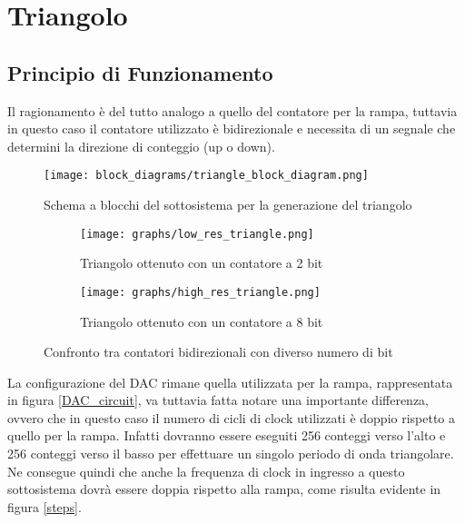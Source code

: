 \section{Triangolo}


\subsection*{Principio di Funzionamento}


Il ragionamento è del tutto analogo a quello del contatore per la rampa, tuttavia in questo
caso il contatore utilizzato è bidirezionale e necessita di un segnale che determini la
direzione di conteggio (up o down).
\medskip

\begin{figure}[ht]
    \centering
    \texttt{[image: block\_diagrams/triangle\_block\_diagram.png]}
    \caption{Schema a blocchi del sottosistema per la generazione del triangolo}
    \label{triangle_block_diagram}
\end{figure}

\begin{figure}[ht]
    \centering

    \begin{subfigure}{.5\textwidth}
        \centering
        \texttt{[image: graphs/low\_res\_triangle.png]}
        \caption{Triangolo ottenuto con un contatore a 2 bit}
        \label{low_res_triangle}
    \end{subfigure}%
    \begin{subfigure}{.5\textwidth}
        \centering
        \texttt{[image: graphs/high\_res\_triangle.png]}
        \caption{Triangolo ottenuto con un contatore a 8 bit}
        \label{high_res_triangle}
    \end{subfigure}

    \caption{Confronto tra contatori bidirezionali con diverso numero di bit}
    \label{triangles}
\end{figure}

La configurazione del DAC rimane quella utilizzata per la rampa, rappresentata in figura
\ref{DAC_circuit}, va tuttavia fatta notare una importante differenza, ovvero che in questo
caso il numero di cicli di clock utilizzati è doppio rispetto a quello per la rampa. Infatti
dovranno essere eseguiti 256 conteggi verso l'alto e 256 conteggi verso il basso per effettuare
un singolo periodo di onda triangolare. Ne consegue quindi che anche la frequenza di clock
in ingresso a questo sottosistema dovrà essere doppia rispetto alla rampa, come risulta
evidente in figura \ref{steps}.
\medskip

